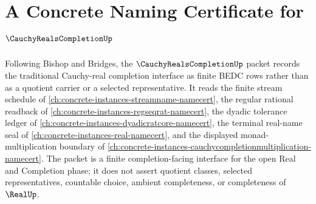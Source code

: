 \chapter{A Concrete Naming Certificate for $\CauchyRealsCompletionUp$}
\label{ch:concrete-instances-cauchy-reals-completion-namecert}

Following Bishop and Bridges, the $\CauchyRealsCompletionUp$ packet records the traditional Cauchy-real completion interface as finite BEDC rows rather than as a quotient carrier or a selected representative. It reads the finite stream schedule of \autoref{ch:concrete-instances-streamname-namecert}, the regular rational readback of \autoref{ch:concrete-instances-regseqrat-namecert}, the dyadic tolerance ledger of \autoref{ch:concrete-instances-dyadicratcore-namecert}, the terminal real-name seal of \autoref{ch:concrete-instances-real-namecert}, and the displayed monad-multiplication boundary of \autoref{ch:concrete-instances-cauchycompletionmultiplication-namecert}. The packet is a finite completion-facing interface for the open Real and Completion phase; it does not assert quotient classes, selected representatives, countable choice, ambient completeness, or completeness of $\RealUp$.

